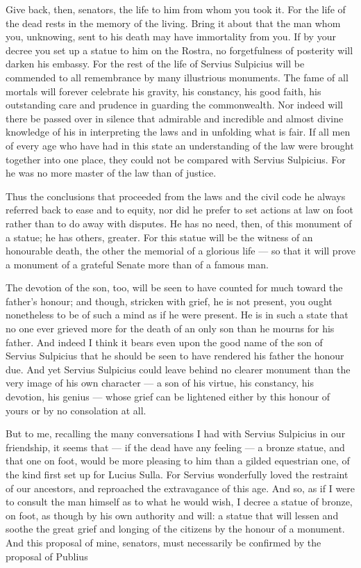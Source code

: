 Give back, then, senators, the life to him from whom you took it. For the life of the dead rests in the memory of the living. Bring it about that the man whom you, unknowing, sent to his death may have immortality from you. If by your decree you set up a statue to him on the Rostra, no forgetfulness of posterity will darken his embassy. For the rest of the life of Servius Sulpicius will be commended to all remembrance by many illustrious monuments. The fame of all mortals will forever celebrate his gravity, his constancy, his good faith, his outstanding care and prudence in guarding the commonwealth. Nor indeed will there be passed over in silence that admirable and incredible and almost divine knowledge of his in interpreting the laws and in unfolding what is fair. If all men of every age who have had in this state an understanding of the law were brought together into one place, they could not be compared with Servius Sulpicius. For he was no more master of the law than of justice.

 Thus the conclusions that proceeded from the laws and the civil code he always referred back to ease and to equity, nor did he prefer to set actions at law on foot rather than to do away with disputes. He has no need, then, of this monument of a statue; he has others, greater. For this statue will be the witness of an honourable death, the other the memorial of a glorious life --- so that it will prove a monument of a grateful Senate more than of a famous man.

 The devotion of the son, too, will be seen to have counted for much toward the father's honour; and though, stricken with grief, he is not present, you ought nonetheless to be of such a mind as if he were present. He is in such a state that no one ever grieved more for the death of an only son than he mourns for his father. And indeed I think it bears even upon the good name of the son of Servius Sulpicius that he should be seen to have rendered his father the honour due. And yet Servius Sulpicius could leave behind no clearer monument than the very image of his own character --- a son of his virtue, his constancy, his devotion, his genius --- whose grief can be lightened either by this honour of yours or by no consolation at all.

 But to me, recalling the many conversations I had with Servius Sulpicius in our friendship, it seems that --- if the dead have any feeling --- a bronze statue, and that one on foot, would be more pleasing to him than a gilded equestrian one, of the kind first set up for Lucius Sulla. For Servius wonderfully loved the restraint of our ancestors, and reproached the extravagance of this age. And so, as if I were to consult the man himself as to what he would wish, I decree a statue of bronze, on foot, as though by his own authority and will: a statue that will lessen and soothe the great grief and longing of the citizens by the honour of a monument. And this proposal of mine, senators, must necessarily be confirmed by the proposal of Publius

